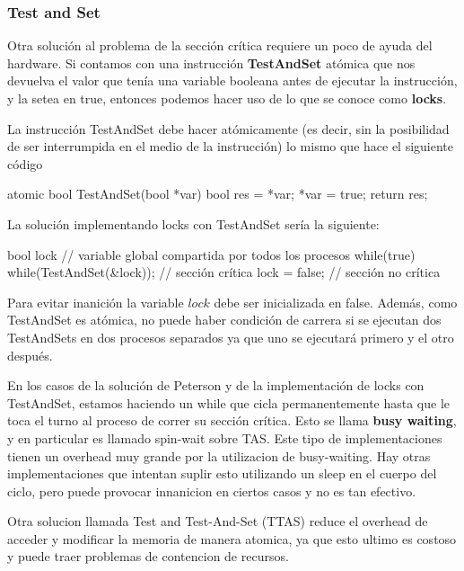 \documentclass{article}
\begin{document}
\subsubsection{Test and Set}

Otra soluci\'on al problema de la secci\'on cr\'itica requiere un poco de ayuda del hardware. Si contamos con una instrucci\'on \textbf{TestAndSet} at\'omica que nos devuelva el valor que ten\'ia una variable booleana antes de ejecutar la instrucci\'on, y la setea en true, entonces podemos hacer uso de lo que se conoce como \textbf{locks}.

La instrucci\'on TestAndSet debe hacer at\'omicamente (es decir, sin la posibilidad de ser interrumpida en el medio de la instrucci\'on) lo mismo que hace el siguiente c\'odigo

\begin{code}
atomic bool TestAndSet(bool *var)
{
    bool res = *var;
		*var = true;
		return res;
}
\end{code}

La soluci\'on implementando locks con TestAndSet ser\'ia la siguiente:

\begin{code}
bool lock // variable global compartida por todos los procesos
while(true)
{
    while(TestAndSet(&lock));
		// sección crítica
		lock = false;
		// sección no crítica
}
\end{code}

Para evitar inanici\'on la variable $lock$ debe ser inicializada en false. Adem\'as, como TestAndSet es at\'omica, no puede haber condici\'on de carrera si se ejecutan dos TestAndSets en dos procesos separados ya que uno se ejecutar\'a primero y el otro despu\'es.

En los casos de la soluci\'on de Peterson y de la implementaci\'on de locks con TestAndSet, estamos haciendo un while que cicla permanentemente hasta que le toca el turno al proceso de correr su secci\'on cr\'itica. Esto se llama \textbf{busy waiting}, y en particular es llamado spin-wait sobre TAS. Este tipo de implementaciones tienen un overhead muy grande por la utilizacion de busy-waiting. Hay otras implementaciones que intentan suplir esto utilizando un sleep en el cuerpo del ciclo, pero puede provocar innanicion en ciertos casos y no es tan efectivo.

Otra solucion llamada Test and Test-And-Set (TTAS) reduce el overhead de acceder y modificar la memoria de manera atomica, ya que esto ultimo es costoso y puede traer problemas de contencion de recursos.
\end{document}
